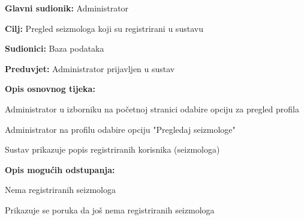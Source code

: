 					\noindent {}
					\begin{packed_item}
	
						\item \textbf{Glavni sudionik:} Administrator
						\item \textbf{Cilj:} Pregled seizmologa koji su registrirani u sustavu
						\item \textbf{Sudionici:} Baza podataka
						\item \textbf{Preduvjet:} Administrator prijavljen u sustav
						\item \textbf{Opis osnovnog tijeka:}
						
						\item[] \begin{packed_enum}
	
							\item Administrator u izborniku na početnoj stranici odabire opciju za pregled profila
							\item Administrator na profilu odabire opciju "Pregledaj seizmologe"
							\item Sustav prikazuje popis registriranih korisnika (seizmologa)
							
						\end{packed_enum}
						
						\item  \textbf{Opis mogućih odstupanja:}
						
						\item[] \begin{packed_item}
	
							\item[2.a] Nema registriranih seizmologa
							\item[] \begin{packed_enum}
								
								\item Prikazuje se poruka da još nema registriranih seizmologa
								
							\end{packed_enum}
							
						\end{packed_item}
					\end{packed_item}

